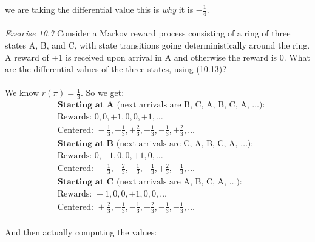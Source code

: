 \documentclass{article}
\begin{document}
we are taking the differential value this is \textit{why} it is $-\frac{1}{4}$.
\\\\
\textit{Exercise 10.7}  Consider a Markov reward process consisting of a ring of three states A, B,
and C, with state transitions going deterministically around the ring. A reward of +1 is
received upon arrival in A and otherwise the reward is 0. What are the differential values
of the three states, using (10.13)?
\\
\\
We know $r(\pi) = \frac{1}{3}$. So we get:
\\
\begin{align*}
&\textbf{Starting at A} \text{ (next arrivals are B, C, A, B, C, A, } \ldots\text{):} \\
&\text{Rewards: } 0, 0, +1, 0, 0, +1, \ldots \\
&\text{Centered: } -\frac{1}{3}, -\frac{1}{3}, +\frac{2}{3}, -\frac{1}{3}, -\frac{1}{3}, +\frac{2}{3}, \ldots \\[10pt]
&\textbf{Starting at B} \text{ (next arrivals are C, A, B, C, A, } \ldots\text{):} \\
&\text{Rewards: } 0, +1, 0, 0, +1, 0, \ldots \\
&\text{Centered: } -\frac{1}{3}, +\frac{2}{3}, -\frac{1}{3}, -\frac{1}{3}, +\frac{2}{3}, -\frac{1}{3}, \ldots \\[10pt]
&\textbf{Starting at C} \text{ (next arrivals are A, B, C, A, } \ldots\text{):} \\
&\text{Rewards: } +1, 0, 0, +1, 0, 0, \ldots \\
&\text{Centered: } +\frac{2}{3}, -\frac{1}{3}, -\frac{1}{3}, +\frac{2}{3}, -\frac{1}{3}, -\frac{1}{3}, \ldots
\end{align*}
\\

And then actually computing the values:
\end{document}
